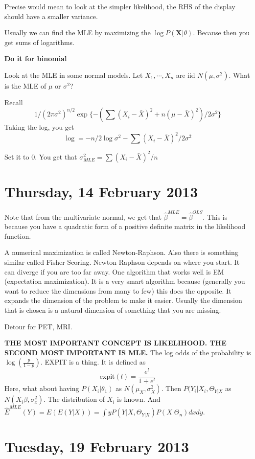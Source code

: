 \documentclass[letterpaper, 12pt]{article}
\theoremstyle{definition}
\theoremstyle{plain}
\begin{document}
Precise would mean to look at the simpler likelihood, the RHS of the display should have a smaller variance.

Usually we can find the MLE by maximizing the $\log P(\textbf{X} | \theta)$. Because then you get sums of logarithms.

\textbf{Do it for binomial}

Look at the MLE in some normal models. Let $X_1, \cdots, X_n$ are iid $N(\mu, \sigma^2)$. What is the MLE of $\mu$ or $\sigma^2$?

Recall 
\[
1 / (2 \pi \sigma^2) ^ {n/2} \exp\{  - (\sum(X_i - \bar{X})^2 + n(\mu - \bar{X})^2) / 2 \sigma^2 \}
\]
Taking the log, you get 
\[
\log = -n/2 \log \sigma^2 - \sum (X_i - \bar{X})^2 / 2 \sigma^2
\]

Set it to $0$. You get that $\sigma^2_{MLE} = \sum(X_i - \bar{X})^2 / n$

\section{Thursday, 14 February 2013}
Note that from the multivariate normal, we get that $\hat{\beta}^{MLE} = \hat{\beta}^{OLS}$. This is because you have a quadratic form of a positive definite matrix in the likelihood function.

A numerical maximization is called Newton-Raphson. Also there is something similar called Fisher Scoring. Newton-Raphson depends on where you start. It can diverge if you are too far away. One algorithm that works well is EM (expectation maximization). It is a very smart algorithm because (generally you want to reduce the dimensions from many to few) this does the opposite. It expands the dimension of the problem to make it easier. Usually the dimension that is chosen is a natural dimension of something that you are missing.

Detour for PET, MRI.

\textbf{THE MOST IMPORTANT CONCEPT IS LIKELIHOOD. THE SECOND MOST IMPORTANT IS MLE.} The log odds of the probability is $\log(\frac{p}{1-p})$. EXPIT is a thing. It is defined as 
\[
\text{expit}(l) = \frac{e^l}{1+e^l}
\]
Here, what about having $P(X_i | \theta _1)$ as $N(\mu_X, \sigma^2_X)$. Then $P(Y_i | X_i, \Theta_{Y|X}$ as $N(X_i \beta, \sigma_x^2)$. The distribution of $X_i$ is known. And $\hat{E}^{MLE} (Y) = E(E(Y|X)) = \int y P(Y | X, \Theta_{Y|X}) P (X| \Theta_n) dxdy$.

\section{Tuesday, 19 February 2013}
\end{document}
